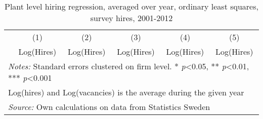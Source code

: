 \begin{table}[htbp]\centering
\def\sym#1{\ifmmode^{#1}\else\(^{#1}\)\fi}
\caption{Plant level hiring regression, averaged over year, ordinary least squares, survey hires, 2001-2012}
\label{tab:robust:average_year}
\begin{tabular}{l*{5}{c}}
\hline\hline
                &\multicolumn{1}{c}{(1)}&\multicolumn{1}{c}{(2)}&\multicolumn{1}{c}{(3)}&\multicolumn{1}{c}{(4)}&\multicolumn{1}{c}{(5)}\\
                &\multicolumn{1}{c}{Log(Hires)}&\multicolumn{1}{c}{Log(Hires)}&\multicolumn{1}{c}{Log(Hires)}&\multicolumn{1}{c}{Log(Hires)}&\multicolumn{1}{c}{Log(Hires)}\\
\hline


\hline 


\hline\hline
\multicolumn{6}{l}{\footnotesize \emph{Notes:} Standard errors clustered on firm level. * \emph{p}<0.05, ** \emph{p}<0.01, *** \emph{p}<0.001}\\
\multicolumn{6}{l}{\footnotesize Log(hires) and Log(vacancies) is the average during the given year}\\
\multicolumn{6}{l}{\footnotesize \emph{Source:} Own calculations on data from Statistics Sweden}\\
\end{tabular}
\end{table}


